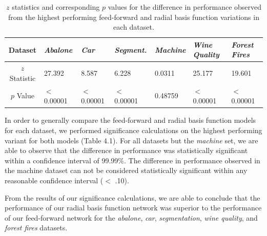 \pagebreak

\begin{table}[t]
	\begin{tabularx}{\linewidth}{|c|X|X|X|X|X|X|}
		\hline
		Dataset & \textit{Abalone} & \textit{Car} & \textit{Segment.} & \textit{Machine} & \textit{Wine Quality} & \textit{Forest Fires} \\
		\hline
		$z$ Statistic & 27.392 & 8.587 & 6.228 & 0.0311 & 25.177 & 19.601 \\
		\hline
		$p$ Value & $<$ 0.00001 & $<$ 0.00001 & $<$ 0.00001 & 0.48759 & $<$ 0.00001 & $<$ 0.00001 \\
		\hline
	\end{tabularx}
	\caption{$z$ statistics and corresponding $p$ values for the difference in performance observed from the highest performing feed-forward and radial basis function variations in each dataset.}
\end{table}

In order to generally compare the feed-forward and radial basis function models for each dataset, we performed significance calculations on the highest performing variant for both models (Table 4.1). For all datasets but the \textit{machine} set, we are able to observe that the difference in performance was statistically significant within a confidence interval of 99.99\%. The difference in performance observed in the machine dataset can not be considered statistically significant within any reasonable confidence interval ($<$ .10).

From the results of our significance calculations, we are able to conclude that the performance of our radial basis function network was superior to the performance of our feed-forward network for the \textit{abalone}, \textit{car}, \textit{segmentation}, \textit{wine quality}, and \textit{forest fires} datasets. 


